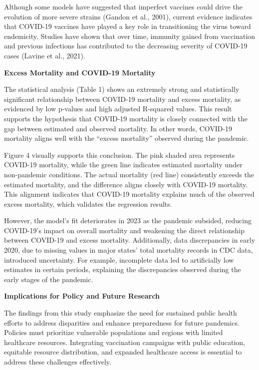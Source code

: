\documentclass[
  letterpaper,
  DIV=11,
  numbers=noendperiod]{scrartcl}
\begin{document}
Although some models have suggested that imperfect vaccines could drive
the evolution of more severe strains (Gandon et al., 2001), current
evidence indicates that COVID-19 vaccines have played a key role in
transitioning the virus toward endemicity. Studies have shown that over
time, immunity gained from vaccination and previous infections has
contributed to the decreasing severity of COVID-19 cases (Lavine et al.,
2021).

\textbf{Excess Mortality and COVID-19 Mortality}

The statistical analysis (Table 1) shows an extremely strong and
statistically significant relationship between COVID-19 mortality and
excess mortality, as evidenced by low p-values and high adjusted
R-squared values. This result supports the hypothesis that COVID-19
mortality is closely connected with the gap between estimated and
observed mortality. In other words, COVID-19 mortality aligns well with
the ``excess mortality'' observed during the pandemic.

Figure 4 visually supports this conclusion. The pink shaded area
represents COVID-19 mortality, while the green line indicates estimated
mortality under non-pandemic conditions. The actual mortality (red line)
consistently exceeds the estimated mortality, and the difference aligns
closely with COVID-19 mortality. This alignment indicates that COVID-19
mortality explains much of the observed excess mortality, which
validates the regression results.

However, the model's fit deteriorates in 2023 as the pandemic subsided,
reducing COVID-19's impact on overall mortality and weakening the direct
relationship between COVID-19 and excess mortality. Additionally, data
discrepancies in early 2020, due to missing values in major states'
total mortality records in CDC data, introduced uncertainty. For
example, incomplete data led to artificially low estimates in certain
periods, explaining the discrepancies observed during the early stages
of the pandemic.

\textbf{Implications for Policy and Future Research}

The findings from this study emphasize the need for sustained public
health efforts to address disparities and enhance preparedness for
future pandemics. Policies must prioritize vulnerable populations and
regions with limited healthcare resources. Integrating vaccination
campaigns with public education, equitable resource distribution, and
expanded healthcare access is essential to address these challenges
effectively.
\end{document}
